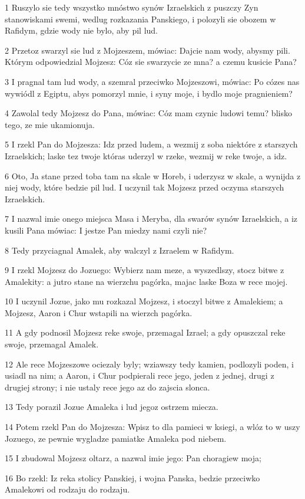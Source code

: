 \par 1 Ruszylo sie tedy wszystko mnóstwo synów Izraelskich z puszczy Zyn stanowiskami swemi, wedlug rozkazania Panskiego, i polozyli sie obozem w Rafidym, gdzie wody nie bylo, aby pil lud.
\par 2 Przetoz swarzyl sie lud z Mojzeszem, mówiac: Dajcie nam wody, abysmy pili. Którym odpowiedzial Mojzesz: Cóz sie swarzycie ze mna? a czemu kusicie Pana?
\par 3 I pragnal tam lud wody, a szemral przeciwko Mojzeszowi, mówiac: Po cózes nas wywiódl z Egiptu, abys pomorzyl mnie, i syny moje, i bydlo moje pragnieniem?
\par 4 Zawolal tedy Mojzesz do Pana, mówiac: Cóz mam czynic ludowi temu? blisko tego, ze mie ukamionuja.
\par 5 I rzekl Pan do Mojzesza: Idz przed ludem, a wezmij z soba niektóre z starszych Izraelskich; laske tez twoje któras uderzyl w rzeke, wezmij w reke twoje, a idz.
\par 6 Oto, Ja stane przed toba tam na skale w Horeb, i uderzysz w skale, a wynijda z niej wody, które bedzie pil lud. I uczynil tak Mojzesz przed oczyma starszych Izraelskich.
\par 7 I nazwal imie onego miejsca Masa i Meryba, dla swarów synów Izraelskich, a iz kusili Pana mówiac: I jestze Pan miedzy nami czyli nie?
\par 8 Tedy przyciagnal Amalek, aby walczyl z Izraelem w Rafidym.
\par 9 I rzekl Mojzesz do Jozuego: Wybierz nam meze, a wyszedlszy, stocz bitwe z Amalekity: a jutro stane na wierzchu pagórka, majac laske Boza w rece mojej.
\par 10 I uczynil Jozue, jako mu rozkazal Mojzesz, i stoczyl bitwe z Amalekiem; a Mojzesz, Aaron i Chur wstapili na wierzch pagórka.
\par 11 A gdy podnosil Mojzesz reke swoje, przemagal Izrael; a gdy opuszczal reke swoje, przemagal Amalek.
\par 12 Ale rece Mojzeszowe ociezaly byly; wziawszy tedy kamien, podlozyli poden, i usiadl na nim; a Aaron, i Chur podpierali rece jego, jeden z jednej, drugi z drugiej strony; i nie ustaly rece jego az do zajscia slonca.
\par 13 Tedy porazil Jozue Amaleka i lud jegoz ostrzem miecza.
\par 14 Potem rzekl Pan do Mojzesza: Wpisz to dla pamieci w ksiegi, a wlóz to w uszy Jozuego, ze pewnie wygladze pamiatke Amaleka pod niebem.
\par 15 I zbudowal Mojzesz oltarz, a nazwal imie jego: Pan choragiew moja;
\par 16 Bo rzekl: Iz reka stolicy Panskiej, i wojna Panska, bedzie przeciwko Amalekowi od rodzaju do rodzaju.

